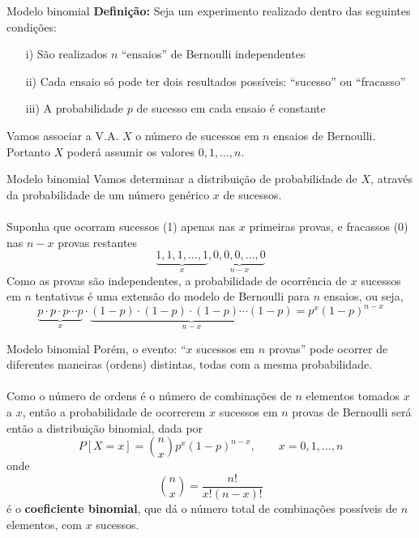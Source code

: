 \documentclass[10pt]{beamer}\usepackage[]{graphicx}\usepackage[]{color}
\theoremstyle{definition}
\begin{document}
\begin{frame}[fragile]{Modelo binomial}
  \textbf{Definição:} Seja um experimento realizado dentro das seguintes
  condições:
  \begin{itemize}
  \item[i)] São realizados $n$ ``ensaios'' de Bernoulli independentes
  \item[ii)] Cada ensaio só pode ter dois resultados possíveis:
    ``sucesso'' ou ``fracasso''
  \item[iii)] A probabilidade $p$ de sucesso em cada ensaio é constante
  \end{itemize}
  \vspace{1em}
  Vamos associar a V.A. $X$ o número de sucessos em $n$ ensaios de
  Bernoulli. Portanto $X$ poderá assumir os valores $0, 1, \ldots, n$.
\end{frame}

\begin{frame}[fragile]{Modelo binomial}
  Vamos determinar a distribuição de probabilidade de $X$, através da
  probabilidade de um número genérico $x$ de sucessos. \\~\\
  Suponha que ocorram sucessos (1) apenas nas $x$ primeiras provas, e
  fracassos (0) nas $n-x$ provas restantes
  \begin{equation*}
    \underbrace{1,1,1,\ldots, 1}_{x}, \underbrace{0,0,0, \ldots, 0}_{n-x}
  \end{equation*}
  Como as provas são independentes, a probabilidade de ocorrência de $x$
  sucessos em $n$ tentativas é uma extensão do modelo de Bernoulli para
  $n$ ensaios, ou seja,
  \begin{equation*}
    \underbrace{p\cdot p\cdot p \cdots p}_{x} \cdot
    \underbrace{(1-p)\cdot (1-p)\cdot (1-p) \cdots (1-p)}_{n-x}
    = p^x (1-p)^{n-x} %
  \end{equation*}
\end{frame}

\begin{frame}[fragile]{Modelo binomial}
  Porém, o evento: ``$x$ sucessos em $n$ provas'' pode ocorrer de
  diferentes maneiras (ordens) distintas, todas com a mesma
  probabilidade. \\~\\
  Como o número de ordens é o número de combinações de $n$ elementos
  tomados $x$ a $x$, então a probabilidade de ocorrerem $x$ sucessos em
  $n$ provas de Bernoulli será então a distribuição binomial, dada por
  \begin{equation*}
    P[X = x] = \binom{n}{x} p^x (1-p)^{n-x}, \quad \quad x = 0, 1, \ldots, n
  \end{equation*}
  onde
  \begin{equation*}
    \binom{n}{x} = \frac{n!}{x!(n-x)!}
  \end{equation*}
  é o \textbf{coeficiente binomial}, que dá o número total de
  combinações possíveis de $n$ elementos, com $x$ sucessos.
\end{frame}
\end{document}
